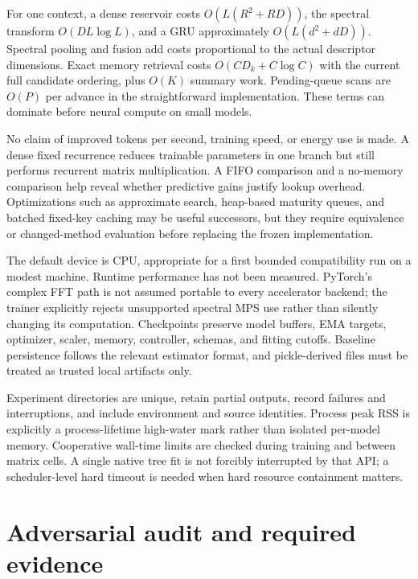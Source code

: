 \documentclass[11pt,a4paper]{article}
\begin{document}
For one context, a dense reservoir costs $O(L(R^2+RD))$, the spectral transform $O(DL\log L)$, and a GRU approximately $O(L(d^2+dD))$. Spectral pooling and fusion add costs proportional to the actual descriptor dimensions. Exact memory retrieval costs $O(CD_k+C\log C)$ with the current full candidate ordering, plus $O(K)$ summary work. Pending-queue scans are $O(P)$ per advance in the straightforward implementation. These terms can dominate before neural compute on small models.

No claim of improved tokens per second, training speed, or energy use is made. A dense fixed recurrence reduces trainable parameters in one branch but still performs recurrent matrix multiplication. A FIFO comparison and a no-memory comparison help reveal whether predictive gains justify lookup overhead. Optimizations such as approximate search, heap-based maturity queues, and batched fixed-key caching may be useful successors, but they require equivalence or changed-method evaluation before replacing the frozen implementation.

The default device is CPU, appropriate for a first bounded compatibility run on a modest machine. Runtime performance has not been measured. PyTorch's complex FFT path is not assumed portable to every accelerator backend; the trainer explicitly rejects unsupported spectral MPS use rather than silently changing its computation. Checkpoints preserve model buffers, EMA targets, optimizer, scaler, memory, controller, schemas, and fitting cutoffs. Baseline persistence follows the relevant estimator format, and pickle-derived files must be treated as trusted local artifacts only.

Experiment directories are unique, retain partial outputs, record failures and interruptions, and include environment and source identities. Process peak RSS is explicitly a process-lifetime high-water mark rather than isolated per-model memory. Cooperative wall-time limits are checked during training and between matrix cells. A single native tree fit is not forcibly interrupted by that API; a scheduler-level hard timeout is needed when hard resource containment matters.

\section{Adversarial audit and required evidence}
\end{document}

